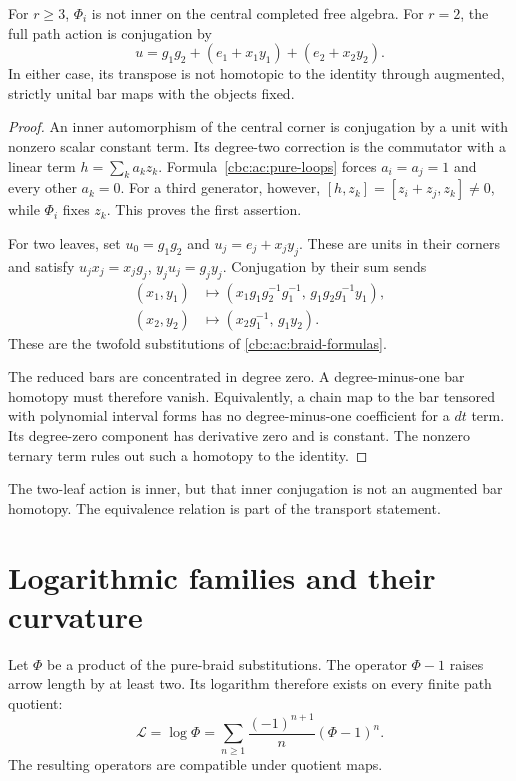 \begin{proposition}\label{cbc:ac:pure-nontrivial}
For $r\geq3$, $\Phi_i$ is not inner on the
central completed free algebra. For $r=2$,
the full path action is conjugation by
\[
 u=g_1g_2+(e_1+x_1y_1)+(e_2+x_2y_2).
\]
In either case, its transpose is not
homotopic to the identity through augmented,
strictly unital bar maps with the objects
fixed.
\end{proposition}
\begin{proof}
An inner automorphism of the central corner
is conjugation by a unit with nonzero scalar
constant term. Its degree-two correction is
the commutator with a linear term
$h=\sum_k a_k z_k$.
Formula~\eqref{cbc:ac:pure-loops} forces
$a_i=a_j=1$ and every other $a_k=0$.
For a third generator, however,
$[h,z_k]=[z_i+z_j,z_k]\ne0$, while
$\Phi_i$ fixes $z_k$. This proves the first
assertion.

For two leaves, set $u_0=g_1g_2$ and
$u_j=e_j+x_jy_j$. These are units in their
corners and satisfy
$u_jx_j=x_jg_j$, $y_ju_j=g_jy_j$.
Conjugation by their sum sends
\[
 \begin{aligned}
 (x_1,y_1)&\longmapsto
   (x_1g_1g_2^{-1}g_1^{-1},\,g_1g_2g_1^{-1}y_1),\\
 (x_2,y_2)&\longmapsto(x_2g_1^{-1},\,g_1y_2).
 \end{aligned}
\]
These are the twofold substitutions of
\eqref{cbc:ac:braid-formulas}.

The reduced bars are concentrated in degree
zero. A degree-minus-one bar homotopy must
therefore vanish. Equivalently, a chain map
to the bar tensored with polynomial interval
forms has no degree-minus-one coefficient
for a $dt$ term. Its degree-zero component
has derivative zero and is constant.
The nonzero ternary term rules out such a
homotopy to the identity.
\end{proof}

The two-leaf action is inner, but that inner
conjugation is not an augmented bar homotopy.
The equivalence relation is part of the
transport statement.

\section{Logarithmic families and their curvature}
\label{cbc:ac:logarithmic}

Let $\Phi$ be a product of the pure-braid
substitutions. The operator $\Phi-1$ raises
arrow length by at least two. Its logarithm
therefore exists on every finite path quotient:
\[
 \mathcal L=\log\Phi
        =\sum_{n\geq1}\frac{(-1)^{n+1}}n(\Phi-1)^n.
\]
The resulting operators are compatible under
quotient maps.

